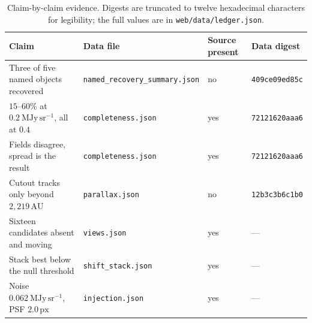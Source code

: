 \documentclass[11pt,a4paper]{article}
\newcommand{\unit}[1]{\,\mathrm{#1}}
\newcommand{\mjysr}{\ \mathrm{MJy\,sr^{-1}}}
\newcommand{\au}{\unit{AU}}
\newcommand{\px}{\unit{px}}
\newcommand{\code}[1]{\texttt{#1}}
\begin{document}
\begin{table}[htbp]
\centering
\small
\caption{Claim-by-claim evidence. Digests are truncated to twelve hexadecimal
characters for legibility; the full values are in \code{web/data/ledger.json}.}
\label{tab:claims}
\scriptsize
\begin{tabular}{p{}p{}p{}p{}}
\toprule
Claim & Data file & Source present & Data digest \\
\midrule
Three of five named objects recovered & \code{named\_recovery\_summary.json} & no & \code{409ce09ed85c} \\
$15$--$60\%$ at $0.2\mjysr$, all at $0.4$ & \code{completeness.json} & yes & \code{72121620aaa6} \\
Fields disagree, spread is the result & \code{completeness.json} & yes & \code{72121620aaa6} \\
Cutout tracks only beyond $2{,}219\au$ & \code{parallax.json} & no & \code{12b3c3b6c1b0} \\
Sixteen candidates absent and moving & \code{views.json} & yes & --- \\
Stack best below the null threshold & \code{shift\_stack.json} & yes & --- \\
Noise $0.062\mjysr$, PSF $2.0\px$ & \code{injection.json} & yes & --- \\
\bottomrule
\end{tabular}
\end{table}
\end{document}
